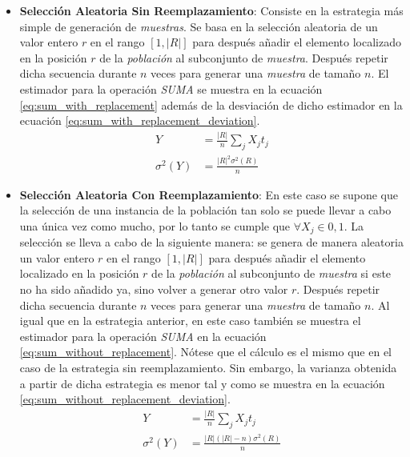 \documentclass{subfiles}
\begin{document}
        \begin{itemize}

          \item \textbf{Selección Aleatoria Sin Reemplazamiento}: Consiste en la estrategia más simple de generación de \emph{muestras}. Se basa en la selección aleatoria de un valor entero $r$ en el rango $[1, |R|]$ para después añadir el elemento localizado en la posición $r$ de la \emph{población} al subconjunto de \emph{muestra}. Después repetir dicha secuencia durante $n$ veces para generar una \emph{muestra} de tamaño $n$. El estimador para la operación \emph{SUMA} se muestra en la ecuación \eqref{eq:sum_with_replacement} además de la desviación de dicho estimador en la ecuación \eqref{eq:sum_with_replacement_deviation}.
            \begin{align}
            \label{eq:sum_with_replacement}
              Y &= \frac{|R|}{n}\sum_jX_jt_j \\
            \label{eq:sum_with_replacement_deviation}
              \sigma^2(Y) &= \frac{|R|^2\sigma^2(R)}{n}
            \end{align}

          \item \textbf{Selección Aleatoria Con Reemplazamiento}: En este caso se supone que la selección de una instancia de la población tan solo se puede llevar a cabo una única vez como mucho, por lo tanto se cumple que $\forall X_j \in {0,1}$. La selección se lleva a cabo de la siguiente manera: se genera de manera aleatoria un valor entero $r$ en el rango $[1, |R|]$ para después añadir el elemento localizado en la posición $r$ de la \emph{población} al subconjunto de \emph{muestra} si este no ha sido añadido ya, sino volver a generar otro valor $r$. Después repetir dicha secuencia durante $n$ veces para generar una \emph{muestra} de tamaño $n$. Al igual que en la estrategia anterior, en este caso también se muestra el estimador para la operación \emph{SUMA} en la ecuación \eqref{eq:sum_without_replacement}. Nótese que el cálculo es el mismo que en el caso de la estrategia sin reemplazamiento. Sin embargo, la varianza obtenida a partir de dicha estrategia es menor tal y como se muestra en la ecuación \eqref{eq:sum_without_replacement_deviation}.
            \begin{align}
            \label{eq:sum_without_replacement}
              Y &= \frac{|R|}{n}\sum_jX_jt_j \\
            \label{eq:sum_without_replacement_deviation}
              \sigma^2(Y) &= \frac{|R|(|R| - n)\sigma^2(R)}{n}
            \end{align}


\end{itemize}
\end{document}
